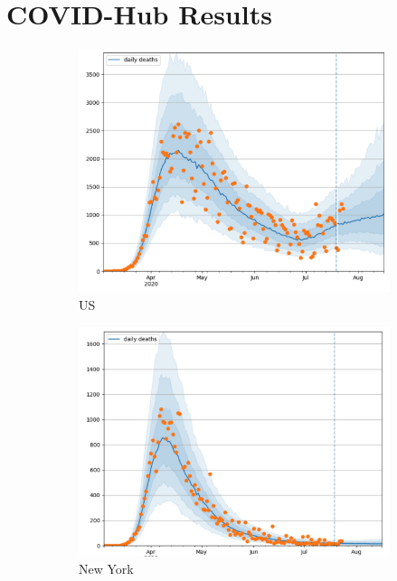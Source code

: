 \documentclass[11pt]{amsart}
\begin{document}
\section{COVID-Hub Results}


\begin{figure}
  \centering
     \begin{subfigure}{.5\textwidth}
  \centering
    \includegraphics[scale=.5]{US.png}
    \caption{US}
\end{subfigure}%
\begin{subfigure}{.5\textwidth}
  \centering
    \includegraphics[scale=.5]{NY.png}
    \caption{New York}
\end{subfigure}
\begin{subfigure}{.5\textwidth}

\end{subfigure}
\end{figure}
\end{document}
